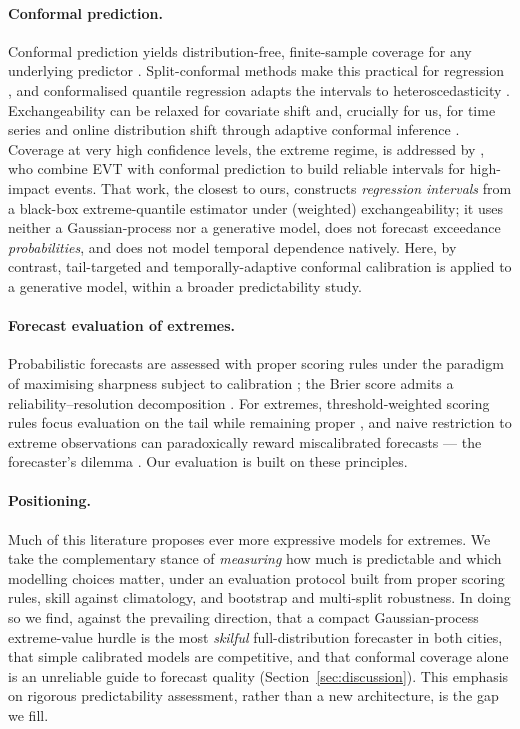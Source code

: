 \documentclass[11pt,a4paper]{article}
\begin{document}
\paragraph{Conformal prediction.}
Conformal prediction yields distribution-free, finite-sample coverage for any
underlying predictor \citep{vovk2005}. Split-conformal methods make this
practical for regression \citep{lei2018}, and conformalised quantile regression
adapts the intervals to heteroscedasticity \citep{romano2019cqr}. Exchangeability
can be relaxed for covariate shift \citep{tibshirani2019} and, crucially for us,
for time series and online distribution shift through adaptive conformal
inference \citep{gibbs2021adaptive,xu2021}. Coverage at very high confidence
levels, the extreme regime, is addressed by \citet{pasche2025extreme}, who
combine EVT with conformal prediction to build reliable intervals for
high-impact events. That work, the closest to ours, constructs \emph{regression
intervals} from a black-box extreme-quantile estimator under (weighted)
exchangeability; it uses neither a Gaussian-process nor a generative model, does
not forecast exceedance \emph{probabilities}, and does not model temporal
dependence natively. Here, by contrast, tail-targeted and temporally-adaptive
conformal calibration is applied to a generative model, within a broader
predictability study.

\paragraph{Forecast evaluation of extremes.}
Probabilistic forecasts are assessed with proper scoring rules
\citep{gneiting2007scoring} under the paradigm of maximising sharpness subject to
calibration \citep{gneiting2007sharpness}; the Brier score admits a
reliability--resolution decomposition \citep{murphy1973}. For extremes,
threshold-weighted scoring rules focus evaluation on the tail
while remaining proper \citep{gneiting2011threshold}, and naive restriction to
extreme observations can paradoxically reward miscalibrated forecasts --- the
forecaster's dilemma \citep{lerch2017dilemma}. Our evaluation is built on these
principles.

\paragraph{Positioning.}
Much of this literature proposes ever more expressive models for extremes. We
take the complementary stance of \emph{measuring} how much is predictable and
which modelling choices matter, under an evaluation protocol built from proper
scoring rules, skill against climatology, and bootstrap and multi-split
robustness. In doing so we find, against the prevailing direction, that
a compact Gaussian-process extreme-value hurdle is the most \emph{skilful} full-distribution forecaster in both cities, that simple calibrated models are competitive, and that conformal coverage alone is an unreliable guide to forecast quality (Section~\ref{sec:discussion}).  This emphasis on rigorous
predictability assessment, rather than a new architecture, is the gap we fill.
\end{document}
